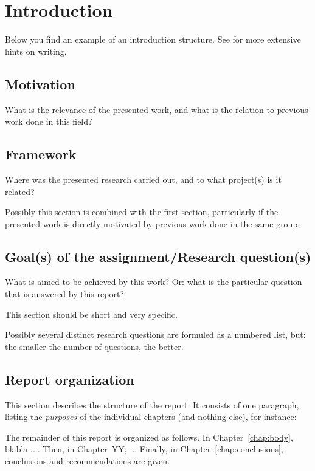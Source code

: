 \chapter{Introduction}
\label{chap:introduction}

Below you find an example of an introduction structure. See \cite{Leferink12,Meijerink12} for more extensive hints on writing.

\section{Motivation}
\label{sec:motivation}
What is the relevance of the presented work, and what is the relation to previous work done in this field?

\section{Framework}
\label{sec:framework}
Where was the presented research carried out, and to what project(s) is it related? 

Possibly this section is combined with the first section, particularly if the presented work is directly motivated by previous work done in the same group. 

\section{Goal(s) of the assignment/Research question(s)}
\label{sec:goal}
What is aimed to be achieved by this work? Or: what is the particular question that is answered by this report? 

This section should be short and very specific. 

Possibly several distinct research questions are formuled as a numbered list, but: the smaller the number of questions, the better. 

\section{Report organization}
\label{sec:organization}
This section describes the structure of the report. It consists of one paragraph, listing the \emph{purposes} of the individual chapters (and nothing else), for instance: 

The remainder of this report is organized as follows. In Chapter~\ref{chap:body}, blabla .... Then, in Chapter~YY, ... Finally, in Chapter~\ref{chap:conclusions}, conclusions and recommendations are given.

